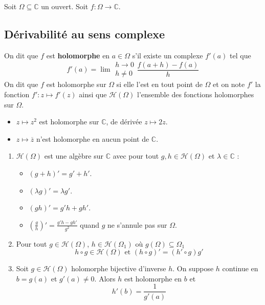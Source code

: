 




  Soit $\Omega \subseteq \mathbb{C}$ un ouvert. Soit $f : \Omega \rightarrow \mathbb{C}$.

  \subsection{Dérivabilité au sens complexe}


  \begin{definition}
    On dit que $f$ est \textbf{holomorphe} en $a \in \Omega$ s'il existe un complexe $f'(a)$ tel que
    \[ f'(a) = \lim{\substack{h \rightarrow 0 \\ h \neq 0}} \frac{f(a+h) - f(a)}{h} \]
    On dit que $f$ est holomorphe sur $\Omega$ si elle l'est en tout point de $\Omega$ et on note $f'$ la fonction $f' : z \mapsto f'(z)$ ainsi que $\mathcal{H}(\Omega)$ l'ensemble des fonctions holomorphes sur $\Omega$.
  \end{definition}

  \begin{example}
    \begin{itemize}
      \item $z \mapsto z^2$ est holomorphe sur $\mathbb{C}$, de dérivée $z \mapsto 2z$.
      \item $z \mapsto \overline{z}$ n'est holomorphe en aucun point de $\mathbb{C}$.
    \end{itemize}
  \end{example}

  \begin{proposition}
    \begin{enumerate}[label=(\roman*)]
      \item $\mathcal{H}(\Omega)$ est une algèbre sur $\mathbb{C}$ avec pour tout $g, h \in \mathcal{H}(\Omega)$ et $\lambda \in \mathbb{C}$ :
      \begin{itemize}
        \item $(g+h)' = g'+h'$.
        \item $(\lambda g)' = \lambda g'$.
        \item $(gh)' = g'h + gh'$.
        \item $\left( \frac{g}{h} \right)' = \frac{g'h - gh'}{g^2}$ quand $g$ ne s'annule pas sur $\Omega$.
      \end{itemize}
      \item Pour tout $g \in \mathcal{H}(\Omega)$, $h \in \mathcal{H}(\Omega_1)$ où $g(\Omega) \subseteq \Omega_1$
      \[ h \circ g \in \mathcal{H}(\Omega) \text{ et } (h \circ g)' = (h' \circ g) g' \]
      \item Soit $g \in \mathcal{H}(\Omega)$ holomorphe bijective d'inverse $h$. On suppose $h$ continue en $b = g(a)$ et $g'(a) \neq 0$. Alors $h$ est holomorphe en $b$ et
      \[ h'(b) = \frac{1}{g'(a)} \]
    \end{enumerate}
  \end{proposition}

